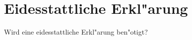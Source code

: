 \chapter*{Eidesstattliche Erkl"arung}\label{s:eid_erkl}

Wird eine eidesstattliche Erkl"arung ben"otigt?


%



